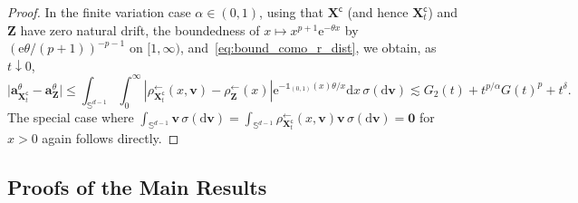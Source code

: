 \documentclass[en,oneside,bbfont,article]{amsart}
\theoremstyle{remark}
\theoremstyle{definition}
\theoremstyle{definition}
\newcommand\Sp{\mathbb{S}}
\newcommand\e{\mathord{\mathrm{e}}}
\newcommand\1{\mathds{1}}
\newcommand\da{\downarrow}
\newcommand\la{\leftarrow}
\renewcommand\le{\leqslant}
\newcommand\co{\mathsf{c}}
\newcommand{\D}{\mathrm{d}}
\begin{document}
\begin{proof}
In the finite variation case $\alpha \in (0,1)$, using that $\bm{X}^\co$ (and hence $\bm{X}^\co_t$) and $\bm{Z}$ have zero natural drift, the boundedness of $x\mapsto x^{p+1}\e^{-\theta x}$ by $(\e\theta/(p+1))^{-p-1}$ on $[1,\infty)$, and~\eqref{eq:bound_como_r_dist}, we obtain, as $t \da 0$, 
\begin{equation*}
\big|\bm{a}_{\bm{X}_t^\co}^\theta
-\bm{a}_{\bm{Z}}^\theta\big|
\le \int_{\Sp^{d-1}}\int_0^\infty
|\rho_{\bm{X}_t^\co}^{\la}(x,\bm{v})-\rho_{\bm{Z}}^{\la}(x)| \e^{-\1_{(0,1)}(x)\theta /x} \D x \, \sigma(\D \bm{v})
\lesssim G_2(t)+t^{p/\alpha}G(t)^p+t^\delta.
\end{equation*}
The special case where $\int_{\Sp^{d-1}}\bm{v}\,\sigma(\D\bm{v})=\int_{\Sp^{d-1}} \rho^{\la}_{\bm{X}_t^\co}(x,\bm{v})\bm{v}\,\sigma(\D\bm{v})=\bm{0}$ for $x>0$ again follows directly.
\end{proof}

\subsection{Proofs of the Main Results}
\label{subsec:proofs_main_results}
\end{document}
